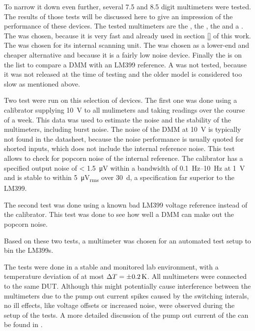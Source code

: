 To narrow it down even further, several \num{7.5} and \num{8.5} digit multimeters were tested. The results of those tests will be discussed here to give an impression of the performance of these devices. The tested multimeters are the , the , the  and a . The  was chosen, because it is very fast and already used in section \ref{} of this work. The  was chosen for its internal scanning unit. The  was chosen as a lower-end and cheaper alternative and because it is a fairly low noise device. Finally the  is on the list to compare a DMM with an LM399 reference. A  was not tested, because it was not released at the time of testing and the older model  is considered too slow as mentioned above.


Two test were run on this selection of devices. The first one was done using a  calibrator supplying \qty{10}{\volt} to all mulimeters and taking readings over the course of a week. This data was used to estimate the noise and the stability of the multimeters, including burst noise. The noise of the DMM at \qty{10}{\volt} is typically not found in the datasheet, because the noise performance is usually quoted for shorted inputs, which does not include the internal reference noise. This test allows to check for popcorn noise of the internal reference. The calibrator has a specified output noise of \qty{< 1.5}{\micro \volt} within a bandwidth of \qtyrange{0.1}{10}{\Hz} at \qty{1}{\volt} and is stable to within \qty{5}{\micro \volt_{rms}} over \qty{30}{\day}, a specification far superior to the LM399.

The second test was done using a known bad LM399 voltage reference instead of the calibrator. This test was done to see how well a DMM can make out the popcorn noise.

Based on these two tests, a multimeter was chosen for an automated test setup to bin the LM399s.


The tests were done in a stable and monitored lab environment, with a temperature deviation of at most $\Delta T = \qty{\pm 0.2}{\kelvin}$. All multimeters were connected to the same DUT. Although this might potentially cause interference between the multimeters due to the pump out current spikes caused by the switching interals, no ill effects, like voltage offsets or increased noise, were observed during the setup of the tests. A more detailed discussion of the pump out current of the  can be found in \cite{article_3458A_input_mpedance}.

